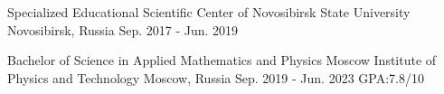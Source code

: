 

\begin{cventries}

   \cventry
    {} %
    {Specialized Educational Scientific Center of Novosibirsk State University} %
    {Novosibirsk, Russia} %
    {Sep. 2017 - Jun. 2019} %
    {
    }
  
  \cventry
    {Bachelor of Science in Applied Mathematics and Physics} %
    {Moscow Institute of Physics and Technology} %
    {Moscow, Russia} %
    {Sep. 2019 - Jun. 2023} %
    {
        GPA:7.8/10
    }
    
 

\end{cventries}

